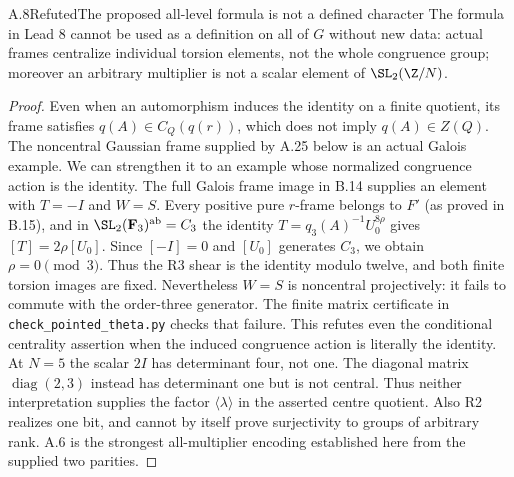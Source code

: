 \begin{statement}{A.8}{Refuted}{The proposed all-level formula is not a defined character}
The formula in Lead 8 cannot be used as a definition on all of
$G$ without new data: actual frames centralize individual torsion
elements, not the whole congruence group; moreover an arbitrary
multiplier is not a scalar element of $\SL_2(\Z/N)$.
\end{statement}
\begin{proof}
Even when an automorphism induces the identity on a finite
quotient, its frame satisfies $q(A)\in C_Q(q(r))$, which does
not imply $q(A)\in Z(Q)$. The noncentral Gaussian frame supplied
by A.25 below is an actual Galois example. We can strengthen it
to an example whose normalized congruence action is the identity.
The full Galois frame image in B.14 supplies an element with
$T=-I$ and $W=S$. Every positive pure $r$-frame belongs to $F'$
(as proved in B.15), and in $\SL_2(\mathbf F_3)^{\rm ab}=C_3$
the identity $T=q_3(A)^{-1}U_0^{8\rho}$ gives
$[T]=2\rho[U_0]$. Since $[-I]=0$ and $[U_0]$ generates $C_3$,
we obtain $\rho=0\pmod3$. Thus the R3 shear is the identity
modulo twelve, and both finite torsion images are fixed.
Nevertheless $W=S$ is noncentral projectively: it fails to commute
with the order-three generator. The finite matrix certificate
in \texttt{check\_pointed\_theta.py} checks that failure.
This refutes even the conditional centrality assertion when the
induced congruence action is literally the identity.
At $N=5$ the scalar
$2I$ has determinant four, not one. The diagonal matrix
$\operatorname{diag}(2,3)$ instead has determinant one but is
not central. Thus neither interpretation supplies the factor
$\langle\lambda\rangle$ in the asserted centre quotient. Also
R2 realizes one bit, and cannot by itself prove surjectivity to
groups of arbitrary rank. A.6 is the strongest all-multiplier
encoding established here from the supplied two parities.
\end{proof}

